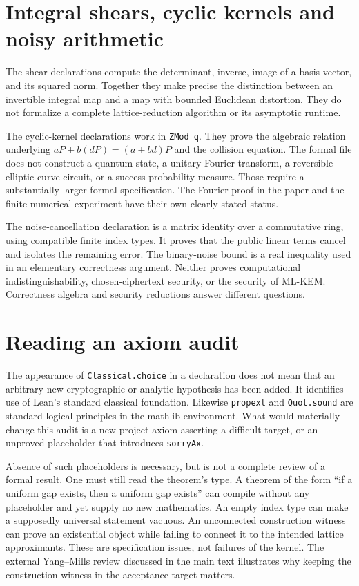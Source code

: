 \section{Integral shears, cyclic kernels and noisy arithmetic}

The shear declarations compute the determinant, inverse, image of a basis
vector, and its squared norm. Together they make precise the distinction
between an invertible integral map and a map with bounded Euclidean
distortion. They do not formalize a complete lattice-reduction algorithm or
its asymptotic runtime.

The cyclic-kernel declarations work in \texttt{ZMod q}. They prove the
algebraic relation underlying
$aP+b(dP)=(a+bd)P$ and the collision equation. The formal file does not
construct a quantum state, a unitary Fourier transform, a reversible
elliptic-curve circuit, or a success-probability measure. Those require a
substantially larger formal specification. The Fourier proof in the paper
and the finite numerical experiment have their own clearly stated status.

The noise-cancellation declaration is a matrix identity over a commutative
ring, using compatible finite index types. It proves that the public linear
terms cancel and isolates the remaining error. The binary-noise bound is a
real inequality used in an elementary correctness argument. Neither proves
computational indistinguishability, chosen-ciphertext security, or the
security of ML-KEM. Correctness algebra and security reductions answer
different questions.

\section{Reading an axiom audit}

The appearance of \texttt{Classical.choice} in a declaration does not mean
that an arbitrary new cryptographic or analytic hypothesis has been added.
It identifies use of Lean's standard classical foundation. Likewise
\texttt{propext} and \texttt{Quot.sound} are standard logical principles in
the mathlib environment. What would materially change this audit is a new
project axiom asserting a difficult target, or an unproved placeholder that
introduces \texttt{sorryAx}.

Absence of such placeholders is necessary, but is not a complete review of a
formal result. One must still read the theorem's type. A theorem of the form
``if a uniform gap exists, then a uniform gap exists'' can compile without
any placeholder and yet supply no new mathematics. An empty index type can
make a supposedly universal statement vacuous. An unconnected construction
witness can prove an existential object while failing to connect it to the
intended lattice approximants. These are specification issues, not failures
of the kernel. The external Yang--Mills review discussed in the main text
illustrates why keeping the construction witness in the acceptance target
matters.

